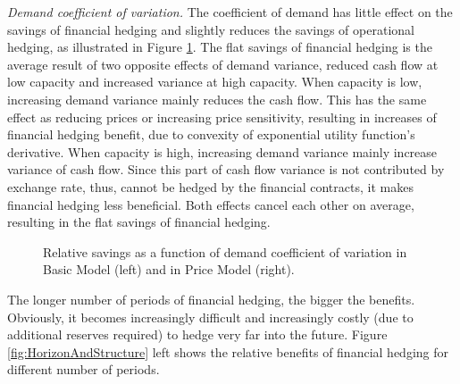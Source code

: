 \documentclass[mnsc,nonblindrev,copyedit]{informs2_wz} %
\begin{document}
{\noindent \em Demand coefficient of variation.} The coefficient of demand has little effect on the savings of financial hedging and slightly reduces the savings of operational hedging, as illustrated in Figure \ref{fig:demand}.  The flat savings of financial hedging is the average result of two opposite effects of demand variance, reduced cash flow at low capacity and increased variance at high capacity.  When capacity is low, increasing demand variance mainly reduces the cash flow.  This has the same effect as reducing prices or increasing price sensitivity, resulting in increases of financial hedging benefit, due to convexity of exponential utility function's derivative.  When capacity is high, increasing demand variance mainly increase variance of cash flow. Since this part of cash flow variance is not contributed by exchange rate, thus, cannot be hedged by the financial contracts, it makes financial hedging less beneficial.  Both effects cancel each other on average, resulting in the flat savings of financial hedging.  %
\begin{figure}[ht]
\begin{center}
\begin{minipage}{6in}
    \begin{minipage}{3.1in}
        \epsfxsize=2.8in
    \hspace{-0.0in}    
    \end{minipage}
    \begin{minipage}{2.8in}
        \epsfxsize=2.8in
    \hspace{-0.0in}    
    \end{minipage}
\end{minipage}
\vspace{.05in} \caption{Relative savings as a function of demand coefficient of variation in Basic Model (left) and in Price Model (right).} \label{fig:demand} \vspace{-.2in}
\end{center}
\end{figure}

The longer number of periods of financial hedging, the bigger the benefits.  Obviously, it becomes increasingly difficult and increasingly costly (due to additional reserves required) to hedge very far into the future.  Figure \ref{fig:HorizonAndStructure} left shows the relative benefits of financial hedging for different number of periods.
\end{document}
